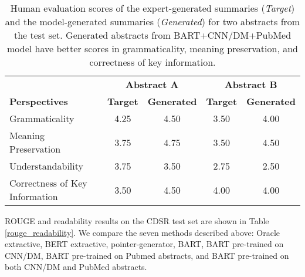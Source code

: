 \documentclass[letterpaper, table]{article} %
\begin{document}


\begin{table*}
\centering
\begin{tabular}{@{} l cc cc @{}}
\toprule
                  & \multicolumn{2}{c}{\textbf{Abstract A}} & \multicolumn{2}{c}{\textbf{Abstract B}} \\
\cmidrule(lr){2-3}
\cmidrule(lr){4-5}
\textbf{Perspectives} & \textbf{Target}  & \textbf{Generated} & \textbf{Target}  & \textbf{Generated} \\
\midrule
Grammaticality            & 4.25    & 4.50        &3.50     & 4.00 \\
Meaning Preservation       & 3.75    & 4.75       & 3.50     & 4.50 \\
Understandability  & 3.75    & 3.50        & 2.75    & 2.50     \\
Correctness of Key Information        & 3.50     & 4.50    & 4.00       & 4.00 \\
\bottomrule
\end{tabular}
\caption{Human evaluation scores of the expert-generated summaries (\textit{Target}) and the model-generated summaries (\textit{Generated}) for two abstracts from the test set. Generated abstracts from BART+CNN/DM+PubMed model have better scores in grammaticality, meaning preservation, and correctness of key information.}
\label{result_human_evaluation}

\end{table*}
ROUGE and readability results on the CDSR test set are shown in Table \ref{rouge_readability}. We compare the seven methods described above: Oracle extractive, BERT extractive, pointer-generator, BART, BART pre-trained on CNN/DM, BART pre-trained on Pubmed abstracts, and BART pre-trained on both CNN/DM and PubMed abstracts.
\end{document}

